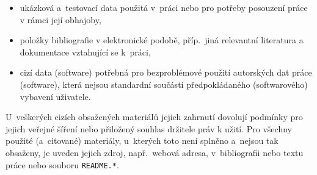 \documentclass[
program=itp,
  biblatex,
  figures=false,
  glossaries,
  index
]{kidiplom}
\begin{document}
\begin{itemize}

\item
  ukázková a~testovací data použitá v~práci nebo pro potřeby posouzení
  práce v rámci její obhajoby,

\item
  položky bibliografie v elektronické podobě, příp.~jiná relevantní literatura
  a dokumentace vztahující se k~práci,

\item
  cizí data (software) potřebná pro bezproblémové použití autorských
  dat práce (software), která nejsou standardní součástí
  předpokládaného (softwarového) vybavení uživatele.

\end{itemize}

U~veškerých cizích obsažených materiálů jejich
zahrnutí dovolují podmínky pro jejich veřejné šíření nebo přiložený souhlas
držitele práv k užití. Pro všechny použité (a~citované) materiály,
u~kterých toto není splněno a~nejsou tak obsaženy, je uveden
jejich zdroj, např.~webová adresa, v~bibliografii nebo textu práce
nebo souboru \texttt{README.*}.


\printglossary


\nocite{*}
\printbibliography

%
%

\printindex
\end{document}
